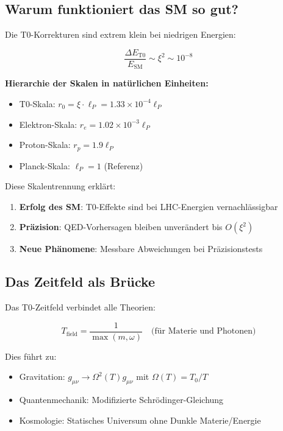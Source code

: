 \documentclass[12pt,a4paper]{article}
\begin{document}
	\subsection{Warum funktioniert das SM so gut?}
	
	Die T0-Korrekturen sind extrem klein bei niedrigen Energien:
	
	\begin{equation}
		\frac{\Delta E_{\text{T0}}}{E_{\text{SM}}} \sim \xi^2 \sim 10^{-8}
	\end{equation}
	
	\textbf{Hierarchie der Skalen in natürlichen Einheiten:}
	\begin{itemize}
		\item T0-Skala: $r_0 = \xi \cdot \ell_P = 1.33 \times 10^{-4} \ell_P$
		\item Elektron-Skala: $r_e = 1.02 \times 10^{-3} \ell_P$
		\item Proton-Skala: $r_p = 1.9 \ell_P$
		\item Planck-Skala: $\ell_P = 1$ (Referenz)
	\end{itemize}
	
	Diese Skalentrennung erklärt:
	\begin{enumerate}
		\item \textbf{Erfolg des SM}: T0-Effekte sind bei LHC-Energien vernachlässigbar
		\item \textbf{Präzision}: QED-Vorhersagen bleiben unverändert bis $O(\xi^2)$
		\item \textbf{Neue Phänomene}: Messbare Abweichungen bei Präzisionstests
	\end{enumerate}
	
	\subsection{Das Zeitfeld als Brücke}
	
	Das T0-Zeitfeld verbindet alle Theorien:
	
	\begin{equation}
		T_{\text{field}} = \frac{1}{\max(m, \omega)} \quad \text{(für Materie und Photonen)}
	\end{equation}
	
	Dies führt zu:
	\begin{itemize}
		\item Gravitation: $g_{\mu\nu} \to \Omega^2(T) g_{\mu\nu}$ mit $\Omega(T) = T_0/T$
		\item Quantenmechanik: Modifizierte Schrödinger-Gleichung
		\item Kosmologie: Statisches Universum ohne Dunkle Materie/Energie
	\end{itemize}
	
\end{document}
